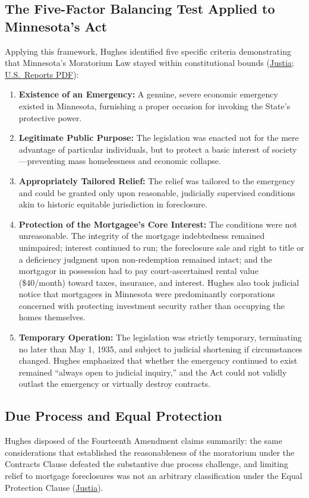 \documentclass[12pt]{article}
\begin{document}
\subsection{The Five-Factor Balancing Test Applied to Minnesota's Act}
Applying this framework, Hughes identified five specific criteria demonstrating that Minnesota's Moratorium Law stayed within constitutional bounds (\href{https://supreme.justia.com/cases/federal/us/290/398/}{Justia}; \href{https://tile.loc.gov/storage-services/service/ll/usrep/usrep290/usrep290398/usrep290398.pdf}{U.S.\ Reports PDF}):
\begin{enumerate}
  \item \textbf{Existence of an Emergency:} A genuine, severe economic emergency existed in Minnesota, furnishing a proper occasion for invoking the State's protective power.
  \item \textbf{Legitimate Public Purpose:} The legislation was enacted not for the mere advantage of particular individuals, but to protect a basic interest of society---preventing mass homelessness and economic collapse.
  \item \textbf{Appropriately Tailored Relief:} The relief was tailored to the emergency and could be granted only upon reasonable, judicially supervised conditions akin to historic equitable jurisdiction in foreclosure.
  \item \textbf{Protection of the Mortgagee's Core Interest:} The conditions were not unreasonable. The integrity of the mortgage indebtedness remained unimpaired; interest continued to run; the foreclosure sale and right to title or a deficiency judgment upon non-redemption remained intact; and the mortgagor in possession had to pay court-ascertained rental value (\$40/month) toward taxes, insurance, and interest. Hughes also took judicial notice that mortgagees in Minnesota were predominantly corporations concerned with protecting investment security rather than occupying the homes themselves.
  \item \textbf{Temporary Operation:} The legislation was strictly temporary, terminating no later than May 1, 1935, and subject to judicial shortening if circumstances changed. Hughes emphasized that whether the emergency continued to exist remained ``always open to judicial inquiry,'' and the Act could not validly outlast the emergency or virtually destroy contracts.
\end{enumerate}

\subsection{Due Process and Equal Protection}
Hughes disposed of the Fourteenth Amendment claims summarily: the same considerations that established the reasonableness of the moratorium under the Contracts Clause defeated the substantive due process challenge, and limiting relief to mortgage foreclosures was not an arbitrary classification under the Equal Protection Clause (\href{https://supreme.justia.com/cases/federal/us/290/398/}{Justia}).
\end{document}
